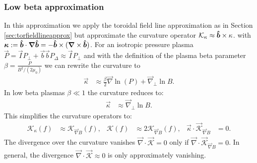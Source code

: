 \subsubsection{Low beta approximation}\label{sec:lowbetaapprox}
In this approximation we apply the toroidal field line approximation
as in Section
\ref{sec:torfieldlineapprox}
but approximate the curvature operator $\mathcal K_\kappa \approx \bm{\hat{b}}\times\kappa$.
  with
  ${\boldsymbol{\kappa}} := \bm{\hat{b}} \cdot {\boldsymbol{\nabla}}\bm{\hat{b}} = -\bm{\hat{b}} \times({\boldsymbol{\nabla}}\times \bm{\hat{b}})$.
For an isotropic pressure plasma \(\vec{P} = \vec{I} P_\perp + \vec{b} \vec{b} P_\Delta \approx \vec{I} P_\perp\) and with the definition of the plasma beta parameter
\(\beta = \frac{P}{B^2/(2 \mu_0) } \)
we can rewrite the curvature to
\begin{align}
 \vec{\kappa} &\approx \frac{\beta}{2} \vec{\nabla} \ln(P) +\vec{\nabla}_\perp \ln{B} .
\end{align}
In low beta plasmas \(\beta\ll1\) the curvature reduces to:
\begin{align}
 \vec{\kappa} & \approx \vec{\nabla}_\perp \ln{B} .
\end{align}
This simplifies the curvature operators to:
\begin{align}
\mathcal{K}_{\kappa}(f)   &\approx  \mathcal{K}_{\vec{\nabla}  B}(f),  &
\mathcal{K} (f) &\approx 2\mathcal{K}_{\vec{\nabla}  B} (f) , &
 \vec{\kappa} \cdot \vec{\mathcal{K}}_{\vec{\nabla}  B} &= 0.
\end{align}
The divergence over the curvature vanishes \( \vec{\nabla} \cdot \vec{ \mathcal{K} } = 0\) only if \( \vec{\nabla} \cdot \vec{ \mathcal{K}}_{\vec{\nabla}  B}   = 0\).
In general, the divergence \( \vec{\nabla} \cdot \vec{ \mathcal{K} } \approx 0\) is only approximately vanishing.
